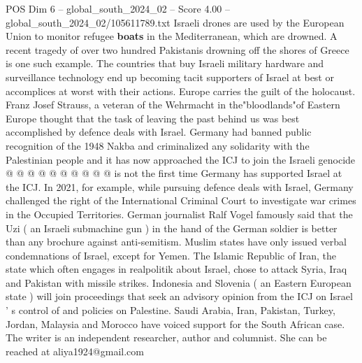 \begin{textsample}{POS Dim 6 – global\_south\_2024\_02 – Score 4.00 – global\_south\_2024\_02/105611789.txt}
Israeli drones are used by the European Union to monitor refugee \textbf{boats} in the Mediterranean, which are drowned.
A recent tragedy of over two hundred Pakistanis drowning off the shores of Greece is one such example.
The countries that buy Israeli military hardware and surveillance technology end up becoming tacit supporters of Israel at best or accomplices at worst with their actions.
Europe carries the guilt of the holocaust.
Franz Josef Strauss, a veteran of the Wehrmacht in the"bloodlands"of Eastern Europe thought that the task of leaving the past behind us was best accomplished by defence deals with Israel.
Germany had banned public recognition of the 1948 Nakba and criminalized any solidarity with the Palestinian people and it has now approached the ICJ to join the Israeli genocide @ @ @ @ @ @ @ @ @ @ is not the first time Germany has supported Israel at the ICJ.
In 2021, for example, while pursuing defence deals with Israel, Germany challenged the right of the International Criminal Court to investigate war crimes in the Occupied Territories.
German journalist Ralf Vogel famously said that the Uzi ( an Israeli submachine gun ) in the hand of the German soldier is better than any brochure against anti-semitism.
Muslim states have only issued verbal condemnations of Israel, except for Yemen.
The Islamic Republic of Iran, the state which often engages in realpolitik about Israel, chose to attack Syria, Iraq and Pakistan with missile strikes.
Indonesia and Slovenia ( an Eastern European state ) will join proceedings that seek an advisory opinion from the ICJ on Israel ' s control of and policies on Palestine.
Saudi Arabia, Iran, Pakistan, Turkey, Jordan, Malaysia and Morocco have voiced support for the South African case.
The writer is an independent researcher, author and columnist.
She can be reached at aliya1924@gmail.com

\end{textsample}
